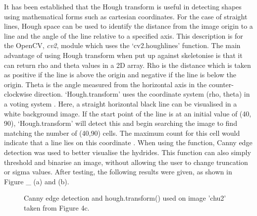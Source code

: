 \documentclass{article}
\begin{document}
	It has been established that the Hough transform is useful in detecting shapes using mathematical forms such as cartesian coordinates. For the case of straight lines, Hough space can be used to identify the distance from the image origin to a line and the angle of the line relative to a specified axis. This description is for the OpenCV, \textit{cv2}, module which uses the ‘cv2.houghlines’ function. The main advantage of using Hough transform when put up against skeletonise is that it can return rho and theta values in a 2D array. Rho is the distance which is taken as positive if the line is above the origin and negative if the line is below the origin. Theta is the angle measured from the horizontal axis in the counter-clockwise direction. ‘Hough.transform’ uses the coordinate system (rho, theta) in a voting system \cite{OpenCV2013}. Here, a straight horizontal black line can be visualised in a white background image. If the start point of the line is at an initial value of (40, 90), ‘Hough.transform’ will detect this and begin searching the image to find matching the number of (40,90) cells. The maximum count for this cell would indicate that a line lies on this coordinate \cite{OpenCV2013}. When using the function, Canny edge detection was used to better visualise the hydrides. This function can also simply threshold and binarise an image, without allowing the user to change truncation or sigma values. After testing, the following results were given, as shown in Figure \_ (a) and (b).
	\\
	\begin{figure}[h]
		\centering
		\hfill
		\caption{Canny edge detection and hough.transform() used on image 'chu2' taken from Figure 4c. }
		\label{Skeletonise2}
	\end{figure}
	\\
\pagebreak
\end{document}
